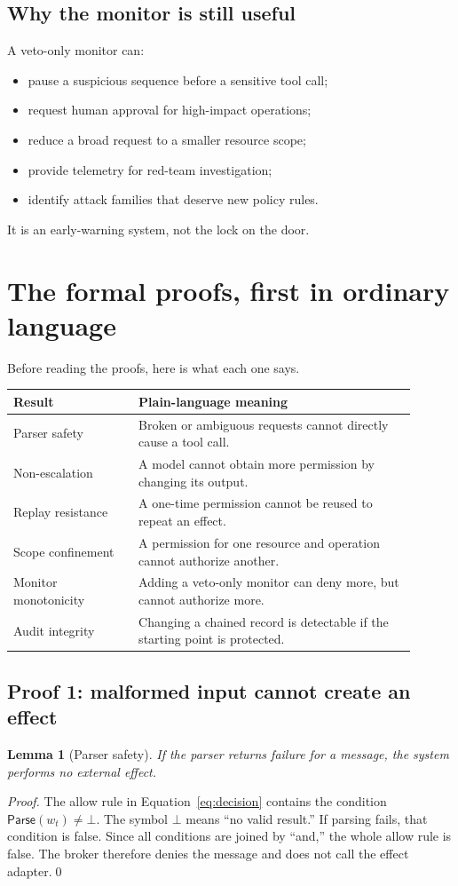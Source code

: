 \documentclass[11pt]{article}
\newtheorem{lemma}[definition]{Lemma}
\begin{document}
\subsection{Why the monitor is still useful}
A veto-only monitor can:
\begin{itemize}
  \item pause a suspicious sequence before a sensitive tool call;
  \item request human approval for high-impact operations;
  \item reduce a broad request to a smaller resource scope;
  \item provide telemetry for red-team investigation;
  \item identify attack families that deserve new policy rules.
\end{itemize}
It is an early-warning system, not the lock on the door.

\section{The formal proofs, first in ordinary language}

Before reading the proofs, here is what each one says.
\begin{longtable}{p{0.28\linewidth}p{0.62\linewidth}}
\toprule
Result & Plain-language meaning \\
\midrule
Parser safety & Broken or ambiguous requests cannot directly cause a tool call. \\
Non-escalation & A model cannot obtain more permission by changing its output. \\
Replay resistance & A one-time permission cannot be reused to repeat an effect. \\
Scope confinement & A permission for one resource and operation cannot authorize another. \\
Monitor monotonicity & Adding a veto-only monitor can deny more, but cannot authorize more. \\
Audit integrity & Changing a chained record is detectable if the starting point is protected. \\
\bottomrule
\end{longtable}

\subsection{Proof 1: malformed input cannot create an effect}
\begin{lemma}[Parser safety]
If the parser returns failure for a message, the system performs no external effect.
\end{lemma}
\begin{proof}
The allow rule in Equation~\eqref{eq:decision} contains the condition $\textsf{Parse}(w_t)\neq\bot$. The symbol $\bot$ means ``no valid result.'' If parsing fails, that condition is false. Since all conditions are joined by ``and,'' the whole allow rule is false. The broker therefore denies the message and does not call the effect adapter.\qed
\end{proof}
\end{document}
